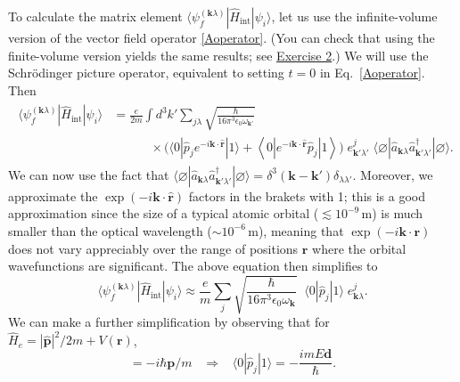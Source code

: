 \documentclass[pra,12pt]{revtex4}
\begin{document}
To calculate the matrix element $\langle
\psi_{f}^{(\mathbf{k}\lambda)}| \hat{H}_{\mathrm{int}}|\psi_i\rangle$,
let us use the infinite-volume version of the vector field operator
\eqref{Aoperator}.  (You can check that using the finite-volume
version yields the same results; see
\hyperref[ex:alpha_finite]{Exercise 2}.)  We will use the
Schr\"odinger picture operator, equivalent to setting $t = 0$ in
Eq.~\eqref{Aoperator}.  Then
\begin{align}
  \begin{aligned}
    \langle \psi_{f}^{(\mathbf{k}\lambda)}| \hat{H}_{\mathrm{int}}|\psi_i\rangle
    &= \frac{e}{2m} \int d^3 k' \sum_{j\lambda}
  \sqrt{\frac{\hbar}{16\pi^3\epsilon_0 \omega_{\mathbf{k}'}}} \\
  &\qquad\quad\times
  \Big(
  \langle 0 |\hat{p}_j e^{-i\mathbf{k}\cdot\hat{\mathbf{r}}} | 1 \rangle
  + \left\langle 0 |e^{-i\mathbf{k}\cdot\hat{\mathbf{r}}} \hat{p}_j| 1 \right\rangle
  \Big) \; e_{\mathbf{k}'\lambda'}^j \;
  \langle\varnothing|\hat{a}_{\mathbf{k}\lambda}
  \hat{a}_{\mathbf{k}'\lambda'}^\dagger|\varnothing\rangle.
  \end{aligned}
\end{align}
We can now use the fact that
$\langle\varnothing|\hat{a}_{\mathbf{k}\lambda}
\hat{a}_{\mathbf{k}'\lambda'}^\dagger|\varnothing\rangle =
\delta^3(\mathbf{k}-\mathbf{k}') \delta_{\lambda\lambda'}$.  Moreover,
we approximate the $\exp(-i\mathbf{k}\cdot\hat{\mathbf{r}})$ factors
in the brakets with 1; this is a good approximation since the size of
a typical atomic orbital ($\lesssim 10^{-9}\,\textrm{m}$) is much
smaller than the optical wavelength ($\sim 10^{-6}\,\textrm{m}$),
meaning that $\exp(-i\mathbf{k}\cdot\mathbf{r})$ does not vary
appreciably over the range of positions $\mathbf{r}$ where the orbital
wavefunctions are significant.  The above equation then simplifies to
\begin{equation}
  \langle \psi_{f}^{(\mathbf{k}\lambda)}| \hat{H}_{\mathrm{int}}|\psi_i\rangle
  \approx \frac{e}{m} \sum_{j}
  \sqrt{\frac{\hbar}{16\pi^3\epsilon_0 \omega_{\mathbf{k}}}} \;\;
  \langle 0 |\hat{p}_j|1 \rangle \; e_{\mathbf{k}\lambda}^j.
\end{equation}
We can make a further simplification by observing that for $\hat{H}_e
= |\hat{\mathbf{p}}|^2/2m + V(\mathbf{r})$,
\begin{equation}
  [\hat{H}_e, \hat{\mathbf{r}}] = -i\hbar\mathbf{p}/m \;\;\;\Rightarrow \;\;\;
  \langle 0|\hat{p}_j|1\rangle = - \frac{imE \mathbf{d}}{\hbar}.
\end{equation}
\end{document}
